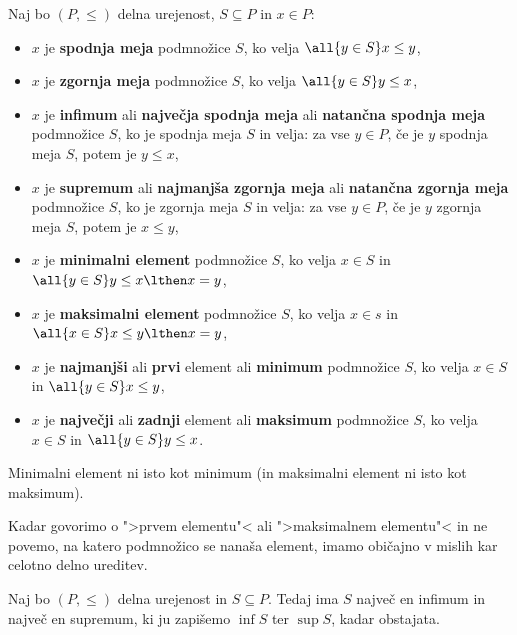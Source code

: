 \begin{definicija}
  Naj bo $(P, {\leq})$ delna urejenost, $S \subseteq P$ in $x \in P$:
  \begin{itemize}

  \item $x$ je \textbf{spodnja meja} podmnožice $S$, ko velja $\all{y \in S} x \leq y$,

  \item $x$ je \textbf{zgornja meja} podmnožice $S$, ko velja $\all{y \in S} y \leq x$,

  \item $x$ je \textbf{infimum} ali \textbf{največja spodnja meja} ali \textbf{natančna spodnja meja} podmnožice $S$, ko je spodnja meja $S$ in velja: za vse $y \in P$, če je $y$ spodnja meja
    $S$, potem je $y \leq x$,

  \item $x$ je \textbf{supremum} ali \textbf{najmanjša zgornja meja} ali \textbf{natančna zgornja meja} podmnožice $S$, ko je zgornja meja $S$ in velja: za vse $y \in P$, če je $y$ zgornja meja $S$, potem je $x \leq y$,

  \item $x$ je \textbf{minimalni element} podmnožice $S$, ko velja $x \in S$ in $\all{y \in S} y \leq x \lthen x = y$,

  \item $x$ je \textbf{maksimalni element} podmnožice $S$, ko velja $x \in s$ in
      $\all{x \in S} x \leq y \lthen x = y$,

  \item $x$ je \textbf{najmanjši} ali \textbf{prvi} element ali \textbf{minimum} podmnožice $S$, ko velja $x \in S$ in $\all{y \in S} x \leq y$,

  \item $x$ je \textbf{največji} ali \textbf{zadnji} element ali \textbf{maksimum} podmnožice $S$, ko velja $x \in S$ in $\all{y \in S} y \leq x$.
\end{itemize}
\end{definicija}

\begin{opomba}
  Minimalni element ni isto kot minimum (in maksimalni element ni isto kot maksimum).
\end{opomba}

Kadar govorimo o ">prvem elementu"< ali ">maksimalnem elementu"< in ne povemo, na
katero podmnožico se nanaša element, imamo običajno v mislih kar celotno delno
ureditev.

\begin{izrek}
  Naj bo $(P, {\leq})$ delna urejenost in $S \subseteq P$. Tedaj ima $S$ največ en
  infimum in največ en supremum, ki ju zapišemo $\inf S$ ter $\sup S$, kadar obstajata.
\end{izrek}

